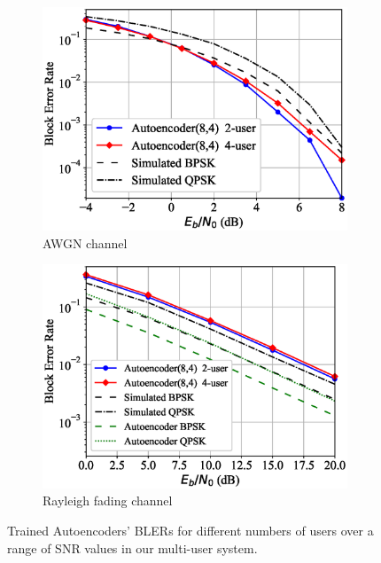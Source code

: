 \begin{figure}[!bp]
	\center
	\begin{subfigure}{0.24\textwidth}
		\includegraphics[width=\linewidth]{figs/multi_autoencoder_bler_awgn}
		\caption{AWGN channel}
	\end{subfigure}
	\begin{subfigure}{0.24\textwidth}
		\includegraphics[width=\linewidth]{figs/multi_autoencoder_bler_rayleigh}
		\caption{Rayleigh fading channel}	
	\end{subfigure}
	\caption{Trained Autoencoders' BLERs for different numbers of users over a range of SNR values in our multi-user system.}
	\label{fig:multi_autoencoder_bler}
\end{figure}



